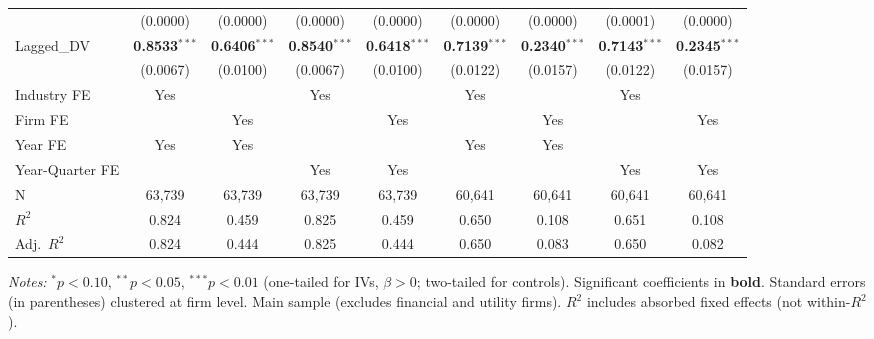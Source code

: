 \documentclass[11pt,a4paper]{article}
\begin{document}
\begin{table}[htbp]
\begin{tabular}{lcccccccc}
 & (0.0000) & (0.0000) & (0.0000) & (0.0000) & (0.0000) & (0.0000) & (0.0001) & (0.0000) \\
Lagged\_DV & \textbf{0.8533}$^{***}$ & \textbf{0.6406}$^{***}$ & \textbf{0.8540}$^{***}$ & \textbf{0.6418}$^{***}$ & \textbf{0.7139}$^{***}$ & \textbf{0.2340}$^{***}$ & \textbf{0.7143}$^{***}$ & \textbf{0.2345}$^{***}$ \\
 & (0.0067) & (0.0100) & (0.0067) & (0.0100) & (0.0122) & (0.0157) & (0.0122) & (0.0157) \\
\midrule
Industry FE & Yes &  & Yes &  & Yes &  & Yes &  \\
Firm FE &  & Yes &  & Yes &  & Yes &  & Yes \\
Year FE & Yes & Yes &  &  & Yes & Yes &  &  \\
Year-Quarter FE &  &  & Yes & Yes &  &  & Yes & Yes \\
\midrule
N & 63,739 & 63,739 & 63,739 & 63,739 & 60,641 & 60,641 & 60,641 & 60,641 \\
$R^2$ & 0.824 & 0.459 & 0.825 & 0.459 & 0.650 & 0.108 & 0.651 & 0.108 \\
Adj.~$R^2$ & 0.824 & 0.444 & 0.825 & 0.444 & 0.650 & 0.083 & 0.650 & 0.082 \\
\bottomrule
\end{tabular}
\begin{minipage}{\linewidth}
\vspace{2pt}\scriptsize
\textit{Notes:} $^{*}p<0.10$, $^{**}p<0.05$, $^{***}p<0.01$ (one-tailed for IVs, $\beta > 0$; two-tailed for controls).
 Significant coefficients in \textbf{bold}.
 Standard errors (in parentheses) clustered at firm level.
 Main sample (excludes financial and utility firms).
 $R^2$ includes absorbed fixed effects (not within-$R^2$).
\end{minipage}
\end{table}
\clearpage
\end{document}
